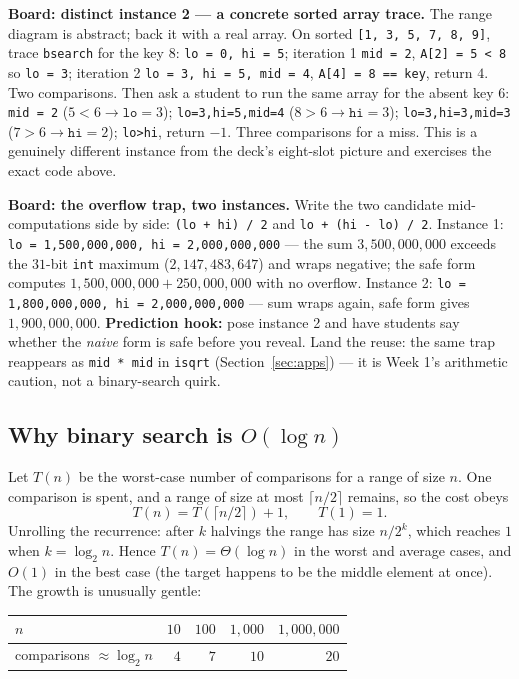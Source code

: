 \documentclass[11pt]{article}
\begin{document}
\textbf{Board: distinct instance 2 --- a concrete sorted array trace.} The range diagram is abstract; back it with a real array. On sorted \texttt{[1, 3, 5, 7, 8, 9]}, trace \texttt{bsearch} for the key $8$: \texttt{lo = 0, hi = 5}; iteration 1 \texttt{mid = 2}, \texttt{A[2] = 5 < 8} so \texttt{lo = 3}; iteration 2 \texttt{lo = 3, hi = 5, mid = 4}, \texttt{A[4] = 8 == key}, return $4$. Two comparisons. Then ask a student to run the same array for the absent key $6$: \texttt{mid = 2} ($5 < 6 \to \texttt{lo}=3$); \texttt{lo=3,hi=5,mid=4} ($8 > 6 \to \texttt{hi}=3$); \texttt{lo=3,hi=3,mid=3} ($7 > 6 \to \texttt{hi}=2$); \texttt{lo>hi}, return $-1$. Three comparisons for a miss. This is a genuinely different instance from the deck's eight-slot picture and exercises the exact code above.

\textbf{Board: the overflow trap, two instances.} Write the two candidate mid-computations side by side: \texttt{(lo + hi) / 2} and \texttt{lo + (hi - lo) / 2}. Instance 1: \texttt{lo = 1{,}500{,}000{,}000, hi = 2{,}000{,}000{,}000} --- the sum $3{,}500{,}000{,}000$ exceeds the $31$-bit \texttt{int} maximum ($2{,}147{,}483{,}647$) and wraps negative; the safe form computes $1{,}500{,}000{,}000 + 250{,}000{,}000$ with no overflow. Instance 2: \texttt{lo = 1{,}800{,}000{,}000, hi = 2{,}000{,}000{,}000} --- sum wraps again, safe form gives $1{,}900{,}000{,}000$. \textbf{Prediction hook:} pose instance 2 and have students say whether the \emph{naive} form is safe before you reveal. Land the reuse: the same trap reappears as \texttt{mid * mid} in \texttt{isqrt} (Section~\ref{sec:apps}) --- it is Week 1's arithmetic caution, not a binary-search quirk.

\subsection{Why binary search is $O(\log n)$}

Let $T(n)$ be the worst-case number of comparisons for a range of size $n$. One comparison is spent, and a range of size at most $\lceil n/2 \rceil$ remains, so the cost obeys
\[ T(n) = T(\lceil n/2 \rceil) + 1, \qquad T(1) = 1. \]
Unrolling the recurrence: after $k$ halvings the range has size $n/2^{k}$, which reaches $1$ when $k = \log_2 n$. Hence $T(n) = \Theta(\log n)$ in the worst and average cases, and $O(1)$ in the best case (the target happens to be the middle element at once). The growth is unusually gentle:

\begin{center}
{\footnotesize
\begin{tabular}{lrrrr}
  \toprule
  $n$ & $10$ & $100$ & $1{,}000$ & $1{,}000{,}000$ \\
  \midrule
  comparisons $\approx \log_2 n$ & $4$ & $7$ & $10$ & $20$ \\
  \bottomrule
\end{tabular}}
\end{center}
\end{document}
